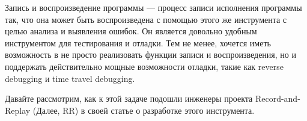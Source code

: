 Запись и воспроизведение программы — процесс записи исполнения программы так, что 
она  может быть воспроизведена с помощью этого же инструмента 
с целью анализа и выявления ошибок.
Он является довольно удобным инструментом для тестирования и отладки. Тем не менее, 
хочется иметь возможность в не просто реализовать функции записи и воспроизведения, 
но и поддержать действительно мощные возможности отладки, 
такие как reverse debugging и time travel debugging.

Давайте рассмотрим, как к этой задаче подошли инженеры проекта Record-and-Replay %
(Далее, RR) в своей статье о разработке этого инструмента.




